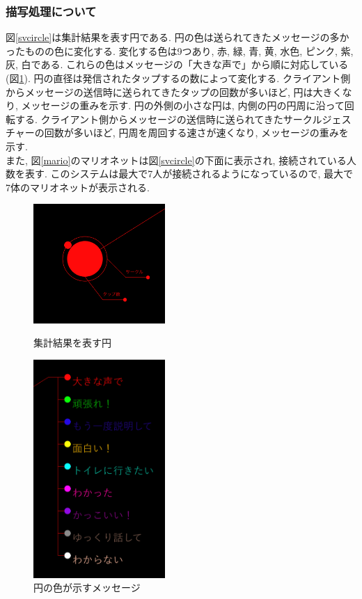 \documentclass{funthesis}
\begin{document}
\subsubsection{描写処理について}
図\ref{svcircle}は集計結果を表す円である. 円の色は送られてきたメッセージの多かったものの色に変化する. 変化する色は9つあり, 赤, 緑, 青, 黄, 水色, ピンク, 紫, 灰, 白である. これらの色はメッセージの「大きな声で」から順に対応している(図\ref{svmessage}). 円の直径は発信されたタップするの数によって変化する. クライアント側からメッセージの送信時に送られてきたタップの回数が多いほど, 円は大きくなり, メッセージの重みを示す. 円の外側の小さな円は, 内側の円の円周に沿って回転する. クライアント側からメッセージの送信時に送られてきたサークルジェスチャーの回数が多いほど, 円周を周回する速さが速くなり, メッセージの重みを示す. \\
また, 図\ref{mario}のマリオネットは図\ref{svcircle}の下面に表示され, 接続されている人数を表す. このシステムは最大で7人が接続されるようになっているので, 最大で7体のマリオネットが表示される. 


\begin{figure}[H]
 \begin{minipage}{0.5\hsize}
  \begin{center}
  \includegraphics[width=50mm]{./img/svcircle.png}
  \end{center}
  \caption{集計結果を表す円}
  \label{svcircle}
 \end{minipage}
 \begin{minipage}{0.5\hsize}
  \begin{center}
  \includegraphics[width=50mm]{./img/svmessagearea.png}
  \end{center}
  \caption{円の色が示すメッセージ}
  \label{svmessage}
  \end{minipage}
\end{figure}
\end{document}
